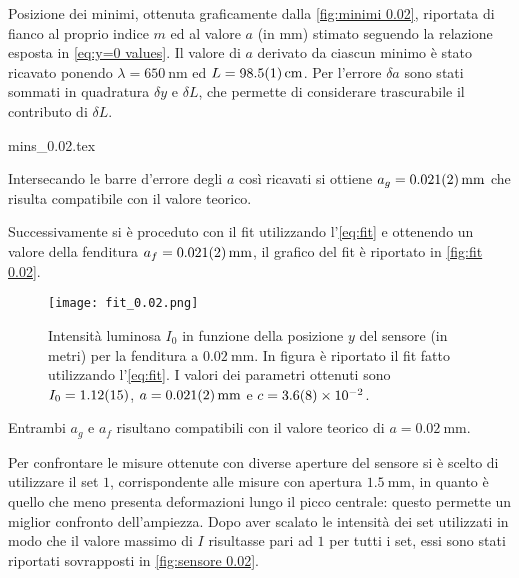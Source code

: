 \documentclass[../main.tex]{subfiles}
\begin{document}
\begin{table}[ht!]
    \centering
    \caption{Posizione dei minimi, ottenuta graficamente dalla \autoref{fig:minimi 0.02}, riportata di fianco al proprio indice $m$ ed al valore $a$ (in $\si{\mm}$) stimato seguendo la relazione esposta in \autoref{eq:y=0 values}. Il valore di $a$ derivato da ciascun minimo è stato ricavato ponendo $\lambda = \qty{650}{\nm}$ ed $L = \qty{98.5+-0.1}{\cm}$. Per l'errore $\delta a$ sono stati sommati in quadratura $\delta y$ e $\delta L$, che permette di considerare trascurabile il contributo di $\delta L$.} %
    {mins_0.02.tex}
    \label{tab:minimi 0.02}
\end{table}

Intersecando le barre d'errore degli $a$ così ricavati si ottiene $a_g = \qty{0.021+-0.002}{\mm}$ che risulta compatibile con il valore teorico.


\newpage

Successivamente si è proceduto con il fit utilizzando l'\autoref{eq:fit} e ottenendo un valore della fenditura $a_f = \qty{0.021+-0.002}{\mm}$, il grafico del fit è riportato in \autoref{fig:fit 0.02}.

\begin{figure}[ht!]
    \centering
    \texttt{[image: fit\_0.02.png]}
    \caption{Intensità luminosa $I_{0}$ in funzione della posizione $y$ del sensore (in metri) per la fenditura a $\qty{0.02}{\mm}$. In figura è riportato il fit fatto utilizzando l'\autoref{eq:fit}. I valori dei parametri ottenuti sono $I_{0} = \num{1.12+-0.15}$, $a = \qty{0.021+-0.002}{\mm}$ e $c = \num{3.6+-0.8e-2}$.}
    \label{fig:fit 0.02}
\end{figure}

Entrambi $a_g$ e $a_f$ risultano compatibili con il valore teorico di $a = \qty{0.02}{\mm}$.

\newpage

Per confrontare le misure ottenute con diverse aperture del sensore si è scelto di utilizzare il set $1$, corrispondente alle misure con apertura $\qty{1.5}{\mm}$, in quanto è quello che meno presenta deformazioni lungo il picco centrale: questo permette un miglior confronto dell'ampiezza. Dopo aver scalato le intensità dei set utilizzati in modo che il valore massimo di $I$ risultasse pari ad $1$ per tutti i set, essi sono stati riportati sovrapposti in \autoref{fig:sensore 0.02}.
\end{document}
